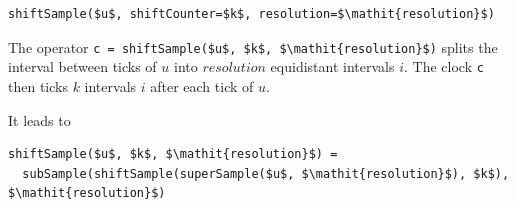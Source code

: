 \begin{operatordefinition}[shiftSample]
\begin{synopsis}\begin{lstlisting}
shiftSample($u$, shiftCounter=$k$, resolution=$\mathit{resolution}$)
\end{lstlisting}\end{synopsis}
\begin{semantics}
The operator \lstinline!c = shiftSample($u$, $k$, $\mathit{resolution}$)! splits the interval between ticks of $u$ into $\mathit{resolution}$ equidistant intervals $i$.
The clock \lstinline!c! then ticks $k$ intervals $i$ after each tick of $u$.

It leads to
\begin{lstlisting}[language=modelica]
shiftSample($u$, $k$, $\mathit{resolution}$) =
  subSample(shiftSample(superSample($u$, $\mathit{resolution}$), $k$), $\mathit{resolution}$)
\end{lstlisting}


\end{semantics}
\end{operatordefinition}
